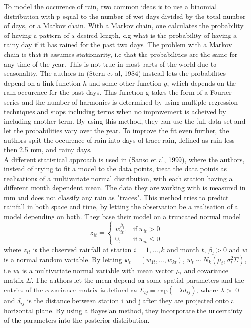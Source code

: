 \documentclass{article}
\begin{document}
	To model the occurence of rain, two common ideas is to use a binomial distribution with p equal to the number of wet days divided by the total number of days, or a Markov chain. With a Markov chain, one calculates the probability of having a pattern of a desired length, e.g what is the probability of having a rainy day if it has rained for the past two days. The problem with a Markov chain is that it assumes stationarity, i.e that the probabilities are the same for any time of the year. This is not true in most parts of the world due to seasonality. The authors in (Stern et al, 1984) instead lets the probabilites depend on a link function $h$ and some other function $g$, which depends on the rain occurence for the past days. This function g takes the form of a Fourier series and the number of harmonics is determined by using multiple regression techniques and stops including terms when no improvement is acheived by including another term. By using this method, they can use the full data set and let the probabilities vary over the year. To improve the fit even further, the authors split the occurence of rain into days of trace rain, defined as rain less then 2.5 mm, and rainy days.\\
	A different statistical approach is used in (Sanso et al, 1999), where the authors, instead of trying to fit a model to the data points, treat the data points as realisations of a multivariate normal distribution, with each station having a different month dependent mean. The data they are working with is measured in mm and does not classify any rain as "traces". This method tries to predict rainfall in both space and time, by letting the observation be a realisation of a model depending on both. They base their model on a truncated normal model
	\begin{equation*}
	z_{it} =
	\begin{cases}
	w^{\beta_t}_{it},& \text{if} \ w_{it}> 0 \\
	0, & \text{if} \ w_{it}  \leq 0 
	\end{cases}
	\end{equation*}
	where $z_{it}$ is the observed rainfall at station $i$ = $1,...,k$ and month $t$, $\beta_t > 0$ and $w$ is a normal random variable. By letting $w_t = (w_{1t}, ...,w_{kt})$, $w_t \sim N_k(\mu_t, \sigma^2_t\Sigma)$, i.e $w_t$ is a multivariate normal variable with mean vector $\mu_t$ and covariance matrix $\Sigma$. The authors let the mean depend on some spatial parameters and the entries of the covariance matrix is defined as $\Sigma_{ij} = \text{exp}(-\lambda d_{ij})$, where $\lambda >$ 0 and $d_{ij}$ is the distance between station i and j after they are projected onto a horizontal plane. By using a Bayesian method, they incorporate the uncertainty of the parameters into the posterior distribution. \\
	
\end{document}
